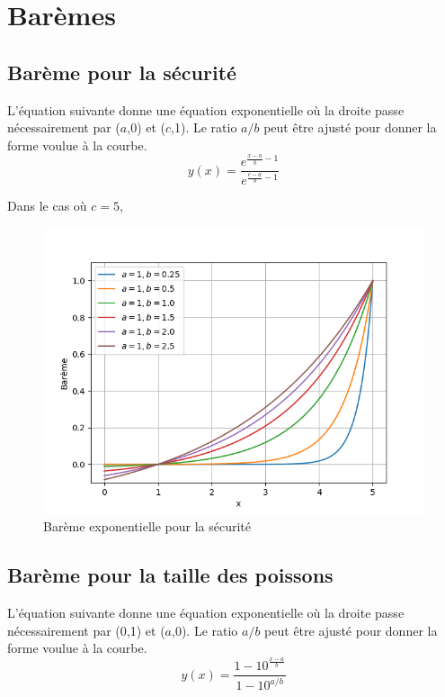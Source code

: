 \chapter{Barèmes}
\label{annexe:baremes}

\section{Barème pour la sécurité}
\label{annexe:baremes_securite}

L'équation suivante donne une équation exponentielle où la droite passe nécessairement par ($a$,0) et ($c$,1). Le ratio $a/b$ peut être ajusté pour donner la forme voulue à la courbe.
\begin{equation}
    y(x) = \frac{e^{\frac{x-a}{b}-1}}{e^{\frac{c-a}{b}-1}}
    \label{annexe:bareme_sécurité}
\end{equation}

Dans le cas où $c=5$,

\begin{figure}[h]
    \centering
    \includegraphics[width=0.75\linewidth]{fig/exp_securite.png}
    \caption{Barème exponentielle pour la sécurité}
    \label{fig:exp_securite}
\end{figure}

\section{Barème pour la taille des poissons}
\label{annexe:baremes_poisson}


L'équation suivante donne une équation exponentielle où la droite passe nécessairement par (0,1) et ($a$,0). Le ratio $a/b$ peut être ajusté pour donner la forme voulue à la courbe.
\begin{equation}
    y(x) = \frac{1-10^{\frac{x-a}{b}}}{1-10^{a/b}}
    \label{annexe:bareme_exp_poisson}
\end{equation}

